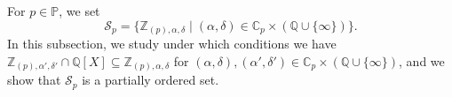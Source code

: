 \documentclass[10pt]{article}
\numberwithin{equation}{section}
\newtheorem{Cor}[equation]{Corollary}
\theoremstyle{definition}
\theoremstyle{definition}
\newcommand{\Q}{\mathbb{Q}}
\newcommand{\Z}{\mathbb{Z}}
\newcommand{\C}{\mathbb{C}}
\renewcommand{\O}{\mathbb{O}}
\newcommand{\PP}{\mathbb{P}}
\newcommand{\oQp}{\overline{\Q_p}}
\newcommand\bc { \color{blue}}
\begin{document}


For $p \in \PP$, we set 
$$\mathcal{S}_p = \{\Z_{(p),\alpha,\delta} \mid (\alpha,\delta)\in \C_p\times(\Q\cup\{\infty\})\}.$$ 
In this subsection, we study under which conditions we have $\Z_{(p),\alpha',\delta'}\cap\Q[X]\subseteq \Z_{(p),\alpha,\delta}$ for 
$(\alpha,\delta),(\alpha',\delta')\in\C_p\times(\Q\cup\{\infty\})$, and we show that $\mathcal{S}_p$ is a 
partially ordered set. 


\end{document}
